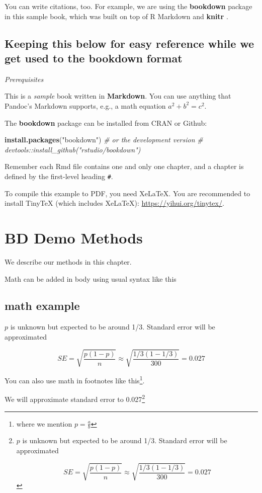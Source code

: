 \documentclass[
]{book}
\newenvironment{Shaded}{\begin{snugshade}}{\end{snugshade}}
\newcommand{\CommentTok}[1]{\textcolor[rgb]{0.56,0.35,0.01}{\textit{#1}}}
\newcommand{\FunctionTok}[1]{\textcolor[rgb]{0.13,0.29,0.53}{\textbf{#1}}}
\newcommand{\NormalTok}[1]{#1}
\newcommand{\StringTok}[1]{\textcolor[rgb]{0.31,0.60,0.02}{#1}}
\begin{document}
You can write citations, too. For example, we are using the \textbf{bookdown} package \citep{R-bookdown} in this sample book, which was built on top of R Markdown and \textbf{knitr} \citep{xie2015}.

\section{Keeping this below for easy reference while we get used to the bookdown format}\label{keeping-this-below-for-easy-reference-while-we-get-used-to-the-bookdown-format}

\emph{Prerequisites}

This is a \emph{sample} book written in \textbf{Markdown}. You can use anything that Pandoc's Markdown supports, e.g., a math equation \(a^2 + b^2 = c^2\).

The \textbf{bookdown} package can be installed from CRAN or Github:

\begin{Shaded}
\begin{Highlighting}[]
\FunctionTok{install.packages}\NormalTok{(}\StringTok{"bookdown"}\NormalTok{)}
\CommentTok{\# or the development version}
\CommentTok{\# devtools::install\_github("rstudio/bookdown")}
\end{Highlighting}
\end{Shaded}

Remember each Rmd file contains one and only one chapter, and a chapter is defined by the first-level heading \texttt{\#}.

To compile this example to PDF, you need XeLaTeX. You are recommended to install TinyTeX (which includes XeLaTeX): \url{https://yihui.org/tinytex/}.

\chapter{BD Demo Methods}\label{bd-demo-methods}

We describe our methods in this chapter.

Math can be added in body using usual syntax like this

\section{math example}\label{math-example}

\(p\) is unknown but expected to be around 1/3. Standard error will be approximated

\[
SE = \sqrt{\frac{p(1-p)}{n}} \approx \sqrt{\frac{1/3 (1 - 1/3)} {300}} = 0.027
\]

You can also use math in footnotes like this\footnote{where we mention \(p = \frac{a}{b}\)}.

We will approximate standard error to 0.027\footnote{\(p\) is unknown but expected to be around 1/3. Standard error will be approximated

  \[
  SE = \sqrt{\frac{p(1-p)}{n}} \approx \sqrt{\frac{1/3 (1 - 1/3)} {300}} = 0.027
  \]}

  
\end{document}
